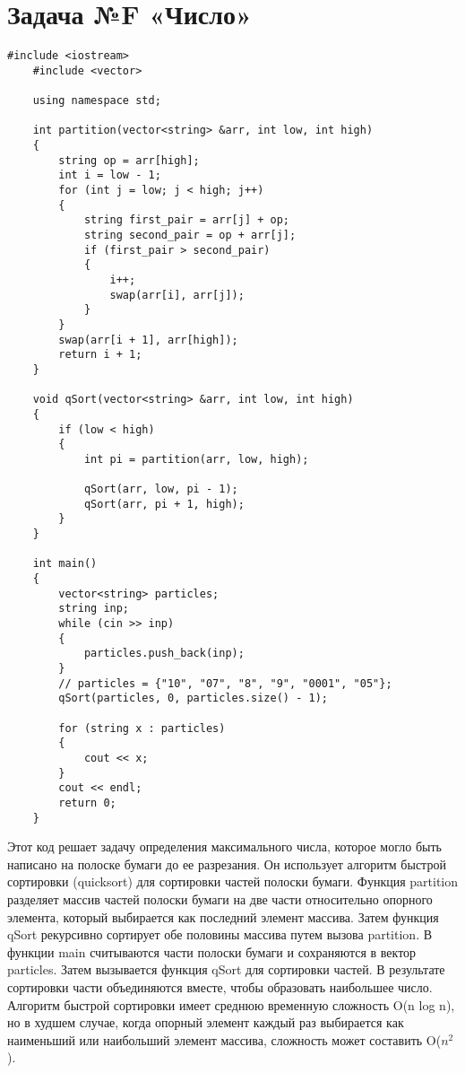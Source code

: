 \documentclass{article}
\begin{document}
\section{Задача №F «Число»}
\begin{lstlisting}[frame=single, basicstyle=\ttfamily, breaklines=true, breakatwhitespace=true, postbreak=\mbox{\textcolor{red}{$\hookrightarrow$}\space}]
    #include <iostream>
    #include <vector>
    
    using namespace std;
    
    int partition(vector<string> &arr, int low, int high)
    {
        string op = arr[high];
        int i = low - 1;
        for (int j = low; j < high; j++)
        {
            string first_pair = arr[j] + op;
            string second_pair = op + arr[j];
            if (first_pair > second_pair)
            {
                i++;
                swap(arr[i], arr[j]);
            }
        }
        swap(arr[i + 1], arr[high]);
        return i + 1;
    }
    
    void qSort(vector<string> &arr, int low, int high)
    {
        if (low < high)
        {
            int pi = partition(arr, low, high);
    
            qSort(arr, low, pi - 1);  
            qSort(arr, pi + 1, high); 
        }
    }
    
    int main()
    {
        vector<string> particles;
        string inp;
        while (cin >> inp)
        {
            particles.push_back(inp);
        }
        // particles = {"10", "07", "8", "9", "0001", "05"};
        qSort(particles, 0, particles.size() - 1);
    
        for (string x : particles)
        {
            cout << x;
        }
        cout << endl;
        return 0;
    }    
\end{lstlisting}
Этот код решает задачу определения максимального числа, которое могло быть написано на полоске бумаги до ее разрезания. Он использует алгоритм быстрой сортировки (quicksort) для сортировки частей полоски бумаги.
Функция partition разделяет массив частей полоски бумаги на две части относительно опорного элемента, который выбирается как последний элемент массива.
Затем функция qSort рекурсивно сортирует обе половины массива путем вызова partition.
В функции main считываются части полоски бумаги и сохраняются в вектор particles.
Затем вызывается функция qSort для сортировки частей.
В результате сортировки части объединяются вместе, чтобы образовать наибольшее число.
Алгоритм быстрой сортировки имеет среднюю временную сложность O(n log n), но в худшем случае, когда опорный элемент каждый раз выбирается как наименьший или наибольший элемент массива, сложность может составить O($n^2$).
\end{document}
